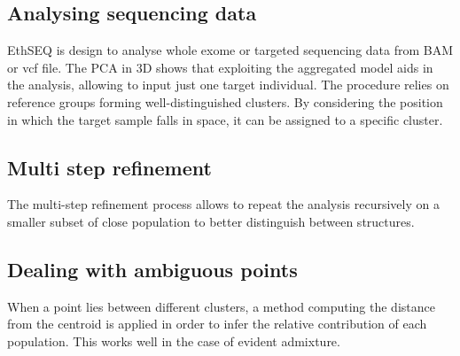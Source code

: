 	\subsection{Analysing sequencing data}
	EthSEQ is design to analyse whole exome or targeted sequencing data from BAM or vcf file.
	The PCA in 3D shows that exploiting the aggregated model aids in the analysis, allowing to input just one target individual.
	The procedure relies on reference groups forming well-distinguished clusters.
	By considering the position in which the target sample falls in space, it can be assigned to a specific cluster.

	\subsection{Multi step refinement}
	The multi-step refinement process allows to repeat the analysis recursively on a smaller subset of close population to better distinguish between structures.

	\subsection{Dealing with ambiguous points}
	When a point lies between different clusters, a method computing the distance from the centroid is applied in order to infer the relative contribution of each population.
	This works well in the case of evident admixture.
